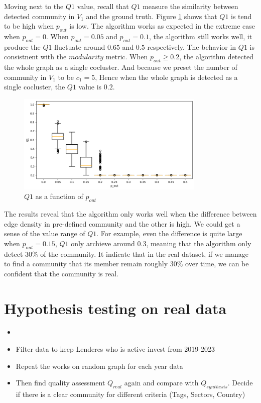 Moving next to the $Q1$ value, recall that $Q1$ measure the similarity between detected community in $V_1$ and the ground truth.
Figure \ref{fig:Q1_pout} shows that $Q1$ is tend to be high when $p_{out}$ is low.
The algorithm works as expected in the extreme case when $p_{out} = 0$.
When $p_{out} = 0.05$ and $p_{out} = 0.1$, the algorithm still works well, it produce the $Q1$ fluctuate around $0.65$ and $0.5$ respectively.
The behavior in $Q1$ is consistnent with the $modularity$ metric.
When $p_{out} \ge 0.2$, the algorithm detected the whole graph as a single cocluster.
And because we preset the number of community in $V_1$ to be $c_1=5$,
Hence when the whole graph is detected as a single cocluster, the $Q1$ value is $0.2$.

\begin{figure}[H]
	\centering
	\includegraphics[width=0.8\textwidth]{images/Q1_pout.png}
	\caption{$Q1$ as a function of $p_{out}$ }
	\label{fig:Q1_pout}
\end{figure}

The results reveal that the algorithm only works well when the difference between edge density in pre-defined community and the other is high.
We could get a sense of the value range of $Q1$.
For example, even the difference is quite large when $p_{out}=0.15$,
$Q1$ only archieve around $0.3$, meaning that the algorithm only detect $30\%$ of the community.
It indicate that in the real dataset, if we manage to find a community that
its member remain roughly $30\%$ over time, we can be confident that the community is real.



\section{Hypothesis testing on real data}

\begin{itemize}
	\item
	\item Filter data to keep Lenderes who is active invest from 2019-2023
	\item Repeat the works on random graph for each year data
	\item Then find quality assessment $Q_{real}$ again and compare with $Q_{synthesis}$.
	      Decide if there is a clear community for different criteria (Tags, Sectors, Country)
\end{itemize}




